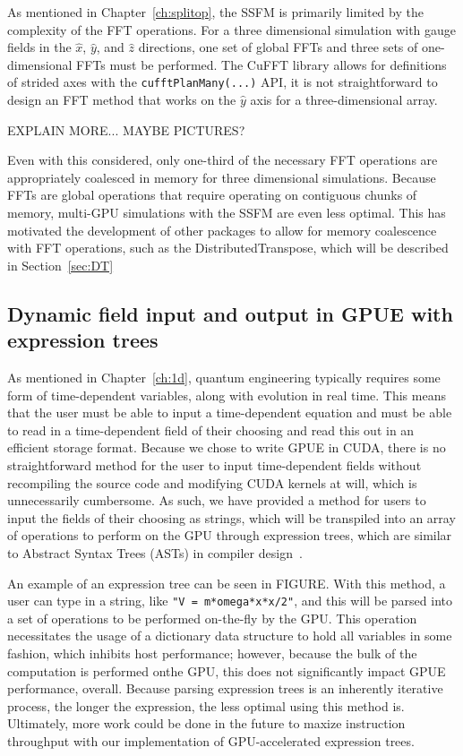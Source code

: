 As mentioned in Chapter~\ref{ch:splitop}, the SSFM is primarily limited by the complexity of the FFT operations.
For a three dimensional simulation with gauge fields in the $\hat x$, $\hat y$, and $\hat z$ directions, one set of global FFTs and three sets of one-dimensional FFTs must be performed.
The CuFFT library allows for definitions of strided axes with the \texttt{cufftPlanMany(...)} API, it is not straightforward to design an FFT method that works on the $\hat y$ axis for a three-dimensional array.

EXPLAIN MORE... MAYBE PICTURES?

Even with this considered, only one-third of the necessary FFT operations are appropriately coalesced in memory for three dimensional simulations.
Because FFTs are global operations that require operating on contiguous chunks of memory, multi-GPU simulations with the SSFM are even less optimal.
This has motivated the development of other packages to allow for memory coalescence with FFT operations, such as the DistributedTranspose, which will be described in Section~\ref{sec:DT}

\subsection{Dynamic field input and output in GPUE with expression trees}

As mentioned in Chapter~\ref{ch:1d}, quantum engineering typically requires some form of time-dependent variables, along with evolution in real time.
This means that the user must be able to input a time-dependent equation and must be able to read in a time-dependent field of their choosing and read this out in an efficient storage format.
Because we chose to write GPUE in CUDA, there is no straightforward method for the user to input time-dependent fields without recompiling the source code and modifying CUDA kernels at will, which is unnecessarily cumbersome.
As such, we have provided a method for users to input the fields of their choosing as strings, which will be transpiled into an array of operations to perform on the GPU through expression trees, which are similar to Abstract Syntax Trees (ASTs) in compiler design~\cite{cohen1991, reyes2011}.

An example of an expression tree can be seen in FIGURE.
With this method, a user can type in a string, like \texttt{"V = m*omega*x*x/2"}, and this will be parsed into a set of operations to be performed on-the-fly by the GPU.
This operation necessitates the usage of a dictionary data structure to hold all variables in some fashion, which inhibits host performance; however, because the bulk of the computation is performed onthe GPU, this does not significantly impact GPUE performance, overall.
Because parsing expression trees is an inherently iterative process, the longer the expression, the less optimal using this method is.
Ultimately, more work could be done in the future to maxize instruction throughput with our implementation of GPU-accelerated expression trees.

